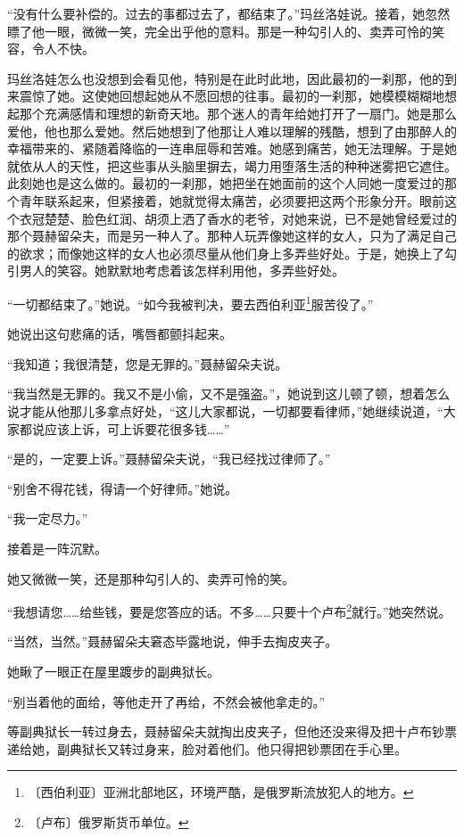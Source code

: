 \documentclass[12pt,UTF-8,openany]{ctexbook}
\begin{document}
\begin{normalsize}
    “没有什么要补偿的。过去的事都过去了，都结束了。”玛丝洛娃说。接着，她忽然瞟了他一眼，微微一笑，完全出乎他的意料。那是一种勾引人的、卖弄可怜的笑容，令人不快。
    
    玛丝洛娃怎么也没想到会看见他，特别是在此时此地，因此最初的一刹那，他的到来震惊了她。这使她回想起她从不愿回想的往事。最初的一刹那，她模模糊糊地想起那个充满感情和理想的新奇天地。那个迷人的青年给她打开了一扇门。她是那么爱他，他也那么爱她。然后她想到了他那让人难以理解的残酷，想到了由那醉人的幸福带来的、紧随着降临的一连串屈辱和苦难。她感到痛苦，她无法理解。于是她就依从人的天性，把这些事从头脑里摒去，竭力用堕落生活的种种迷雾把它遮住。此刻她也是这么做的。最初的一刹那，她把坐在她面前的这个人同她一度爱过的那个青年联系起来，但紧接着，她就觉得太痛苦，必须要把这两个形象分开。眼前这个衣冠楚楚、脸色红润、胡须上洒了香水的老爷，对她来说，已不是她曾经爱过的那个聂赫留朵夫，而是另一种人了。那种人玩弄像她这样的女人，只为了满足自己的欲求；而像她这样的女人也必须尽量从他们身上多弄些好处。于是，她换上了勾引男人的笑容。她默默地考虑着该怎样利用他，多弄些好处。
    
    “一切都结束了。”她说。“如今我被判决，要去西伯利亚\footnote{〔西伯利亚〕亚洲北部地区，环境严酷，是俄罗斯流放犯人的地方。}服苦役了。”
    
    她说出这句悲痛的话，嘴唇都颤抖起来。
    
    “我知道；我很清楚，您是无罪的。”聂赫留朵夫说。
    
    “我当然是无罪的。我又不是小偷，又不是强盗。”，她说到这儿顿了顿，想着怎么说才能从他那儿多拿点好处，“这儿大家都说，一切都要看律师，”她继续说道，“大家都说应该上诉，可上诉要花很多钱……”
    
    “是的，一定要上诉。”聂赫留朵夫说，“我已经找过律师了。”
    
    “别舍不得花钱，得请一个好律师。”她说。
    
    “我一定尽力。”
    
    接着是一阵沉默。
    
    她又微微一笑，还是那种勾引人的、卖弄可怜的笑。
    
    “我想请您……给些钱，要是您答应的话。不多……只要十个卢布\footnote{〔卢布〕俄罗斯货币单位。}就行。”她突然说。
    
    “当然，当然。”聂赫留朵夫窘态毕露地说，伸手去掏皮夹子。
    
    她瞅了一眼正在屋里踱步的副典狱长。
    
    “别当着他的面给，等他走开了再给，不然会被他拿走的。”
    
    等副典狱长一转过身去，聂赫留朵夫就掏出皮夹子，但他还没来得及把十卢布钞票递给她，副典狱长又转过身来，脸对着他们。他只得把钞票团在手心里。
    

\end{normalsize}
\end{document}

